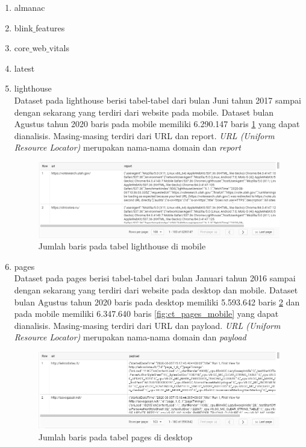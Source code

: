 \begin{enumerate}
	\item almanac\\
	\item blink$\_$features\\
	\item core$\_$web$\_$vitals\\
	\item latest\\
	\item lighthouse\\
	Dataset pada lighthouse berisi tabel-tabel dari bulan Juni tahun 2017 sampai dengan sekarang yang terdiri dari website pada mobile. Dataset bulan Agustus tahun 2020 baris pada mobile memiliki 6.290.147 baris \ref{fig:ct_lh_mobile} yang dapat dianalisis. Masing-masing terdiri dari URL dan report. \textit{URL (Uniform Resource Locator)} merupakan nama-nama domain dan \textit{report}
	\begin{figure}[H]
		\centering  
		\includegraphics[scale=0.9]{Gambar/2020_08_01_mobile_jumlah_baris_lighthouse.PNG}  
		\caption{Jumlah baris pada tabel lighthouse di mobile} 
		\label{fig:ct_lh_mobile} 
	\end{figure}
	
	\item pages\\
	Dataset pada pages berisi tabel-tabel dari bulan Januari tahun 2016 sampai dengan sekarang yang terdiri dari website pada desktop dan mobile. Dataset bulan Agustus tahun 2020 baris pada desktop memiliki 5.593.642 baris \ref{fig:ct_pages_desktop} dan pada mobile memiliki 6.347.640 baris \ref{fig:ct_pages_mobile} yang dapat dianalisis. Masing-masing terdiri dari URL dan payload. \textit{URL (Uniform Resource Locator)} merupakan nama-nama domain dan \textit{payload}
	\begin{figure}[H]
		\centering  
		\includegraphics[scale=0.9]{Gambar/2020_08_01_desktop_jumlah_baris_pages.PNG}  
		\caption{Jumlah baris pada tabel pages di desktop} 
		\label{fig:ct_pages_desktop} 
	\end{figure}
	

\end{enumerate}

